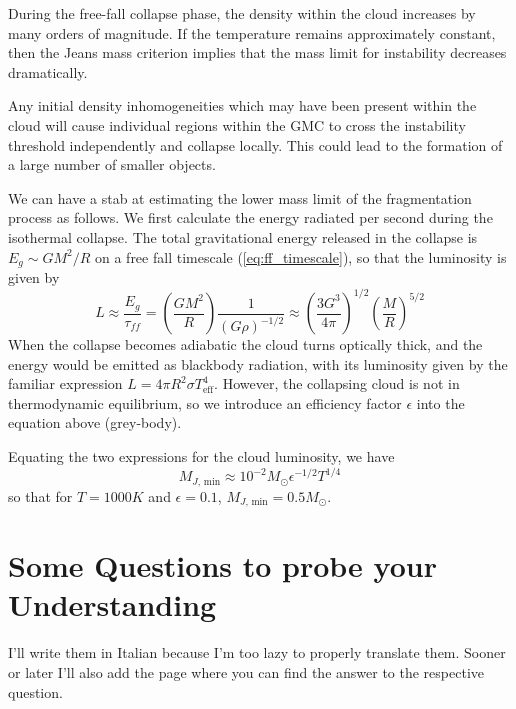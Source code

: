During the free-fall collapse phase, the density within the cloud increases by many orders of magnitude. If the temperature remains approximately constant, then the Jeans mass criterion implies that the mass limit for instability decreases dramatically.
\par Any initial density inhomogeneities which may have been present within the cloud will cause individual regions within the GMC to cross the instability threshold independently and collapse locally. This could lead to the formation of a large number of smaller objects.
\par We can have a stab at estimating the lower mass limit of the fragmentation process as follows. We first calculate the energy radiated per second during the isothermal collapse. The total gravitational energy released in the collapse is $E_{g}\sim GM^{2}/R$ on a free fall timescale (\ref{eq:ff_timescale}), so that the luminosity is given by 
\begin{equation*}
    L \approx \frac{E_{g}}{\tau_{ff}} = \left(\frac{GM^{2}}{R}\right)\frac{1}{(G\rho)^{-1/2}} \approx \left(\frac{3G^{3}}{4\pi}\right)^{1/2}\left(\frac{M}{R}\right)^{5/2}
\end{equation*}
When the collapse becomes adiabatic the cloud turns optically thick, and the energy would be emitted as blackbody radiation, with its luminosity given by the familiar expression $L = 4\pi R^{2}\sigma T_{\text{eff}}^{4}$. However, the collapsing cloud is not in thermodynamic equilibrium, so we introduce an efficiency factor $\epsilon$ into the equation above (grey-body).
\par Equating the two expressions for the cloud luminosity, we have
\begin{equation*}
    M_{J,\,\text{min}} \approx 10^{-2}M_{\odot}\epsilon^{-1/2}T^{1/4}
\end{equation*}
so that for $T = 1000\unit{K}$ and $\epsilon = 0.1$, $M_{J,\,\text{min}} = 0.5M_{\odot}$.

\newpage
\section*{Some Questions to probe your Understanding}

I'll write them in Italian because I'm too lazy to properly translate them. Sooner or later I'll also add the page where you can find the answer to the respective question.

